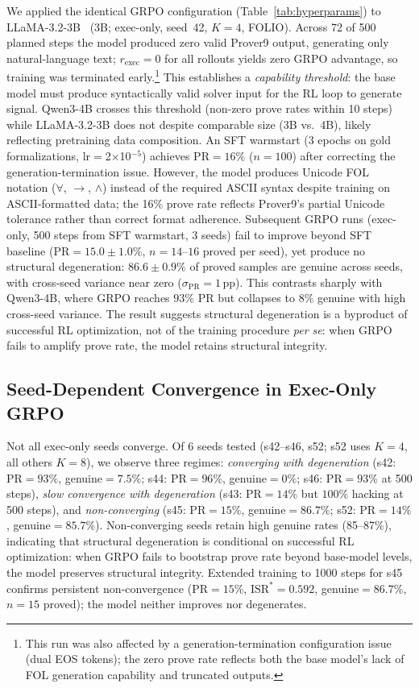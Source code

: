 We applied the identical GRPO configuration (Table~\ref{tab:hyperparams}) to LLaMA-3.2-3B~\citep{grattafiori2024llama} (3B; exec-only, seed~42, $K{=}4$, FOLIO).
Across 72 of 500 planned steps the model produced zero valid Prover9 output, generating only natural-language text; $r_{\text{exec}}{=}0$ for all rollouts yields zero GRPO advantage, so training was terminated early.\footnote{This run was also affected by a generation-termination configuration issue (dual EOS tokens); the zero prove rate reflects both the base model's lack of FOL generation capability and truncated outputs.}
This establishes a \emph{capability threshold}: the base model must produce syntactically valid solver input for the RL loop to generate signal.
Qwen3-4B crosses this threshold (non-zero prove rates within 10 steps) while LLaMA-3.2-3B does not despite comparable size (3B vs.\ 4B), likely reflecting pretraining data composition.
An SFT warmstart (3 epochs on gold formalizations, lr$=$2$\times$10$^{-5}$) achieves $\text{PR}{=}16\%$ ($n{=}100$) after correcting the generation-termination issue.
However, the model produces Unicode FOL notation ($\forall$, $\to$, $\wedge$) instead of the required ASCII syntax despite training on ASCII-formatted data; the 16\% prove rate reflects Prover9's partial Unicode tolerance rather than correct format adherence.
Subsequent GRPO runs (exec-only, 500 steps from SFT warmstart, 3 seeds) fail to improve beyond SFT baseline ($\text{PR}{=}15.0{\pm}1.0\%$, $n{=}14$--$16$ proved per seed), yet produce no structural degeneration: $86.6{\pm}0.9\%$ of proved samples are genuine across seeds, with cross-seed variance near zero ($\sigma_{\text{PR}}{=}1$\,pp).
This contrasts sharply with Qwen3-4B, where GRPO reaches $93\%$ PR but collapses to $8\%$ genuine with high cross-seed variance.
The result suggests structural degeneration is a byproduct of successful RL optimization, not of the training procedure \emph{per se}: when GRPO fails to amplify prove rate, the model retains structural integrity.

\subsection{Seed-Dependent Convergence in Exec-Only GRPO}
\label{app:seed-convergence}

Not all exec-only seeds converge.
Of 6 seeds tested (s42--s46, s52; s52 uses $K{=}4$, all others $K{=}8$), we observe three regimes: \emph{converging with degeneration} (s42: $\text{PR}{=}93\%$, genuine${=}7.5\%$; s44: $\text{PR}{=}96\%$, genuine${=}0\%$; s46: $\text{PR}{=}93\%$ at 500 steps), \emph{slow convergence with degeneration} (s43: $\text{PR}{=}14\%$ but $100\%$ hacking at 500 steps), and \emph{non-converging} (s45: $\text{PR}{=}15\%$, genuine${=}86.7\%$; s52: $\text{PR}{=}14\%$, genuine${=}85.7\%$).
Non-converging seeds retain high genuine rates (85--87\%), indicating that structural degeneration is conditional on successful RL optimization: when GRPO fails to bootstrap prove rate beyond base-model levels, the model preserves structural integrity.
Extended training to 1000 steps for s45 confirms persistent non-convergence ($\text{PR}{=}15\%$, $\text{ISR}^*{=}0.592$, genuine${=}86.7\%$, $n{=}15$ proved); the model neither improves nor degenerates.

